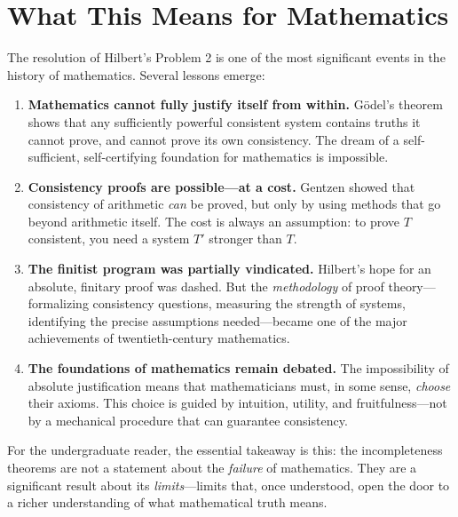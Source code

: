 \section{What This Means for Mathematics}

The resolution of Hilbert's Problem 2 is one of the most significant events in the history of mathematics. Several lessons emerge:

\begin{enumerate}
    \item \textbf{Mathematics cannot fully justify itself from within.} G\"odel's theorem shows that any sufficiently powerful consistent system contains truths it cannot prove, and cannot prove its own consistency. The dream of a self-sufficient, self-certifying foundation for mathematics is impossible.

    \item \textbf{Consistency proofs are possible---at a cost.} Gentzen showed that consistency of arithmetic \emph{can} be proved, but only by using methods that go beyond arithmetic itself. The cost is always an assumption: to prove $T$ consistent, you need a system $T'$ stronger than $T$.

    \item \textbf{The finitist program was partially vindicated.} Hilbert's hope for an absolute, finitary proof was dashed. But the \emph{methodology} of proof theory---formalizing consistency questions, measuring the strength of systems, identifying the precise assumptions needed---became one of the major achievements of twentieth-century mathematics.

    \item \textbf{The foundations of mathematics remain debated.} The impossibility of absolute justification means that mathematicians must, in some sense, \emph{choose} their axioms. This choice is guided by intuition, utility, and fruitfulness---not by a mechanical procedure that can guarantee consistency.
\end{enumerate}

For the undergraduate reader, the essential takeaway is this: the incompleteness theorems are not a statement about the \emph{failure} of mathematics. They are a significant result about its \emph{limits}---limits that, once understood, open the door to a richer understanding of what mathematical truth means.

